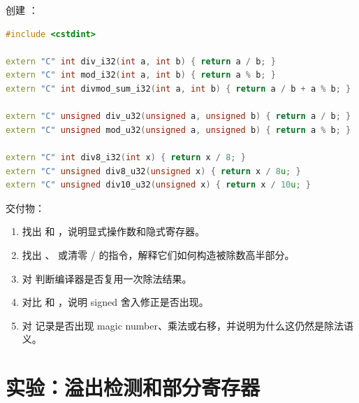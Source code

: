 \begin{labbox}
创建 ：

\begin{lstlisting}[language=C++]
#include <cstdint>

extern "C" int div_i32(int a, int b) { return a / b; }
extern "C" int mod_i32(int a, int b) { return a % b; }
extern "C" int divmod_sum_i32(int a, int b) { return a / b + a % b; }

extern "C" unsigned div_u32(unsigned a, unsigned b) { return a / b; }
extern "C" unsigned mod_u32(unsigned a, unsigned b) { return a % b; }

extern "C" int div8_i32(int x) { return x / 8; }
extern "C" unsigned div8_u32(unsigned x) { return x / 8u; }
extern "C" unsigned div10_u32(unsigned x) { return x / 10u; }
\end{lstlisting}

交付物：

\begin{enumerate}
  \item 找出  和 ，说明显式操作数和隐式寄存器。
  \item 找出 、 或清零 / 的指令，解释它们如何构造被除数高半部分。
  \item 对  判断编译器是否复用一次除法结果。
  \item 对比  和 ，说明 signed 舍入修正是否出现。
  \item 对  记录是否出现 magic number、乘法或右移，并说明为什么这仍然是除法语义。
\end{enumerate}
\end{labbox}

\section{实验：溢出检测和部分寄存器}

